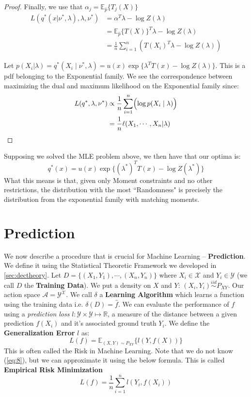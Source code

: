 \documentclass[]{article}
\theoremstyle{mattstyle}
\theoremstyle{definition}
\begin{document}
\begin{proof}
	Finally, we use that $\alpha_j = \mathbb{E}_{\hat{p}}\{T_j(X)\}$
	\begin{align*}
	L(q^*(x| \nu^*, \lambda),\lambda,\nu^*) &= \alpha^T\lambda -\log Z(\lambda)\\
	&= \mathbb{E}_{\hat{p}}\{T(X)\}^T\lambda - \log Z(\lambda)\\
	&= \frac{1}{n}\sum_{i=1}^n \left( T(X_i)^T\lambda - \log Z(\lambda) \right)
	\end{align*}
	
	Let  $p(X_i | \lambda) = q^*(X_i \mid \nu^*, \lambda) = u(x)\exp\{ \lambda^TT(x) - \log Z(\lambda)\}$. This is a pdf belonging to the Exponential family. We see the correspondence between maximizing the dual and maximum likelihood on the Exponential family since:
	\begin{align*}
	L(q^*,\lambda,\nu^*) &\propto \frac{1}{n}\sum_{i=1}^n \Bigl( \log p(X_i \mid \lambda) \Bigr) \\
	&=\frac{1}{n}\ell(X_1, \cdots, X_n | \lambda)
	\end{align*}
\end{proof}

Supposing we solved the MLE problem above, we then have that our optima is:
$$q^*(x)=u(x)\exp\{ (\lambda^*)^TT(x) - \log Z(\lambda^*)\}$$
What this means is that, given only Moment constraints and no other restrictions, the distribution with the most ``Randomness" is precisely the distribution from the exponential family with matching moments.

\newpage

\section{Prediction}

We now describe a procedure that is crucial for Machine Learning -- \textbf{Prediction}. We define it using the Statistical Theoretic Framework we developed in \ref{sec:dectheory}. Let $D=\{(X_1,Y_1), \cdots, (X_n,Y_n)\}$ where $X_i \in \mathcal{X}$ and $Y_i \in \mathcal{Y}$ (we call $D$ the \textbf{Training Data}). We put a density on $X$ and $Y$: $(X_i,Y_i) \overset{iid}{\sim} P_{XY}$. Our action space $\mathcal{A} = \mathcal{Y}^\mathcal{X}$. We call \(\delta\) a \textbf{Learning Algorithm} which learns a function using the training data i.e. $\delta(D) = \hat{f}$. We can evaluate the performance of $f$ using a \emph{prediction loss} $l: \mathcal{Y} \times \mathcal{Y} \mapsto \mathbb{R}$, a measure of the distance between a given prediction $f(X_i)$ and it’s associated ground truth $Y_i$. We define the \textbf{Generalization Error} $l$ as:
\begin{equation}\label{eq:8}
L(f) = \mathbb{E}_{(X,Y)\sim P_{XY}}\{l(Y,f(X)) \}
\end{equation}
This is often called the Risk in Machine Learning. Note that we do not know (\ref{eq:8}), but we can approximate it using the below formula. This is called \textbf{Empirical Risk Minimization}
\begin{equation}\label{eq:erm}
L(f) = \frac{1}{n}\sum_{i=1}^n l\left(Y_i,f(X_i)\right)
\end{equation}
\end{document}
